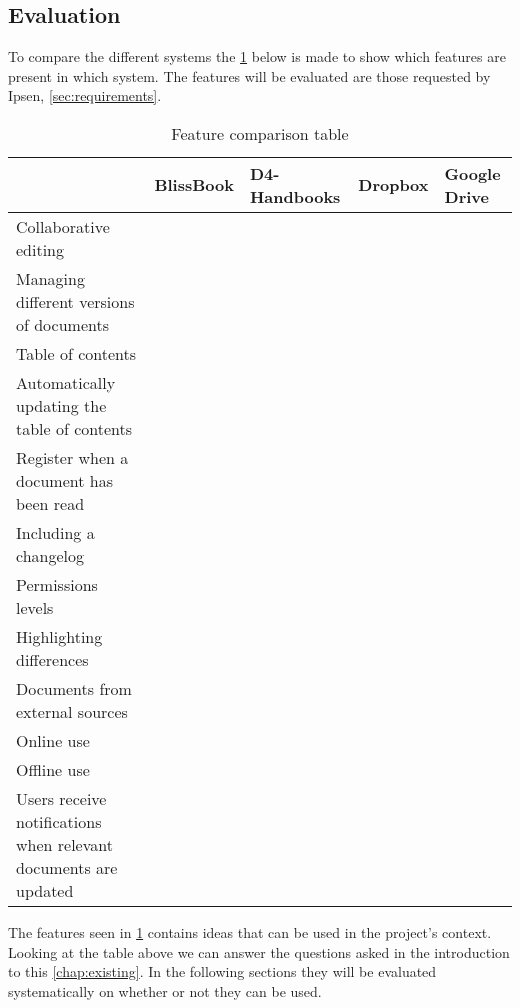 \subsection{Evaluation}\label{sec:solutionsevaluation}
To compare the different systems the \cref{tab:Exsisting} below is made to show which features are present in which system.
The features will be evaluated are those requested by Ipsen, \cref{sec:requirements}.

\begin{table}[H]
	\begin{center}
		\begin{tabular}{| m{5cm}|m{1.6cm}|m{2cm}|m{1.5cm}|m{1.2cm}|}
			\hline
			& BlissBook  & D4-Handbooks & Dropbox & Google \newline Drive \\
			\hline
			Collaborative editing & \checkmark & & & \checkmark \\
			\hline
			Managing different versions of documents & \checkmark &  &  & \checkmark \\
			\hline
			Table of contents & \checkmark & \checkmark  & & \\
			\hline
			Automatically updating the table of contents & \checkmark & \checkmark  &  & \\
			\hline
			Register when a document has been read & \checkmark & \checkmark &  & \\
			\hline
			Including a changelog & \checkmark & \checkmark  &  & \\
			\hline
			Permissions levels & \checkmark &  & \checkmark & \checkmark \\
			\hline
			Highlighting differences & \checkmark &  &  & \checkmark\\
			\hline
			Documents from external \newline sources &  &  & \checkmark & \checkmark \\
			\hline
			Online use & \checkmark &  \checkmark & \checkmark  & \checkmark \\
			\hline
			Offline use & & \checkmark & \checkmark & \checkmark \\
			\hline
			Users receive notifications when relevant documents are updated & & \checkmark & & \\
			\hline
		\end{tabular}
		\caption{Feature comparison table}\label{tab:Exsisting}
	\end{center}
\end{table}

The features seen in \cref{tab:Exsisting} contains ideas that can be used in the project's context.
Looking at the table above we can answer the questions asked in the introduction to this \cref{chap:existing}.
In the following sections they will be evaluated systematically on whether or not they can be used.

